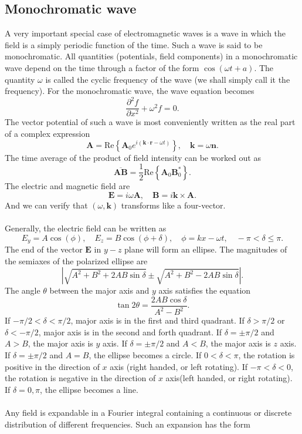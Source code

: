 \subsection{Monochromatic wave}
A very important special case of electromagnetic waves is a wave in which the field is a simply periodic function of the time. Such a wave is said to be monochromatic. All quantities
(potentials, field components) in a monochromatic wave depend on the time through a factor of the form $\cos(\omega t + a)$. The quantity $\omega$ is called the cyclic frequency of the wave (we shall simply call it the frequency). For the monochromatic wave, the wave equation becomes
\[\frac{\partial^2 f}{\partial x^2} +	 \omega^2 f = 0.\]
The vector potential of such a wave is most conveniently written as the real part of a complex expression
\[\bm{A} = \mathrm{Re}\left\{ \bm{A}_0 e^{i(\bm{k}\cdot\bm{r}-\omega t)}\right\} , \quad \bm{k} = \omega \bm{n}.\]
The time average of the product of field intensity can be worked out as
\[\overline{\bm{A}\bm{B}} = \frac{1}{2}\mathrm{Re}\left\{ \bm{A}_0 \bm{B}_0^*\right\}.\]
The electric and magnetic field are
\[\bm{E} = i\omega \bm{A} , \quad \bm{B} = i\bm{k}\times\bm{A}.\]
And we can verify that $(\omega,\bm{k})$ transforms like a four-vector.
\\ \\
Generally, the electric field can be  written as
\[E_y = A\cos(\phi) , \quad E_z = B\cos(\phi + \delta) , \quad \phi= kx -\omega t   , \quad -\pi < \delta \leq \pi.\]
The end of the vector $\bm{E}$ in $y-z$ plane will form an ellipse. The magnitudes of the semiaxes of the polarized ellipse are
\[|\sqrt{A^2+B^2+2AB\sin\delta} \pm \sqrt{A^2+B^2-2AB\sin\delta}|.\]
The angle $\theta$ between the major axis and $y$ axis satisfies the equation
\[\tan 2\theta = \frac{2AB\cos\delta}{A^2-B^2}.\]
If $-{\pi}/{2} < \delta < {\pi}/{2}$, major axis is in the first and third quadrant. If $\delta > {\pi}/{2}$ or $\delta < -{\pi}/{2}$, major axis is in the second and forth quadrant. If $\delta = \pm {\pi}/{2}$ and $A>B$, the major axis is $y$ axis. If $\delta = \pm {\pi}/{2}$ and $A<B$, the major axis is $z$ axis. If $\delta = \pm {\pi}/{2}$ and $A=B$, the ellipse becomes a circle.
If $0 < \delta < \pi$, the rotation is positive in the direction of $x$ axis (right handed, or left rotating). 
If $-\pi < \delta < 0$, the rotation is negative in the direction of $x$ axis(left handed, or right rotating). 
If $\delta = 0,\pi$, the ellipse becomes a line.
\\ \\
Any field is expandable in a Fourier integral containing a continuous or discrete distribution of different frequencies. Such an expansion has the form
